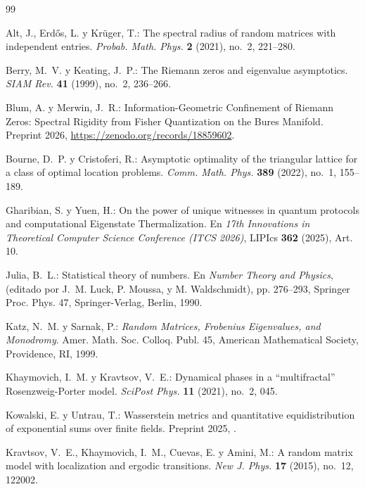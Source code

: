 \documentclass{article}
\numberwithin{equation}{section}
\theoremstyle{plain}
\theoremstyle{definition}
\begin{document}
\begin{thebibliography}{99}

Alt, J., Erdős, L. y Krüger, T.:
The spectral radius of random matrices with independent entries.
\emph{Probab. Math. Phys.} \textbf{2} (2021), no.~2, 221--280.

Berry, M.~V. y Keating, J.~P.: 
The Riemann zeros and eigenvalue asymptotics. 
\emph{SIAM Rev.} \textbf{41} (1999), no.~2, 236--266.

Blum, A. y Merwin, J.~R.:
Information-Geometric Confinement of Riemann Zeros: Spectral Rigidity from Fisher Quantization on the Bures Manifold.
Preprint 2026, \url{https://zenodo.org/records/18859602}.

Bourne, D.~P. y Cristoferi, R.: 
Asymptotic optimality of the triangular lattice for a class of optimal location problems. 
\emph{Comm. Math. Phys.} \textbf{389} (2022), no.~1, 155--189.

Gharibian, S. y Yuen, H.:
On the power of unique witnesses in quantum protocols and computational Eigenstate Thermalization.
En \emph{17th Innovations in Theoretical Computer Science Conference (ITCS 2026)}, LIPIcs \textbf{362} (2025), Art. 10.

Julia, B.~L.: 
Statistical theory of numbers.
En \emph{Number Theory and Physics}, (editado por J.~M. Luck, P. Moussa, y M. Waldschmidt), 
pp. 276--293, Springer Proc. Phys. 47, Springer-Verlag, Berlin, 1990.

Katz, N.~M. y Sarnak, P.: 
\emph{Random Matrices, Frobenius Eigenvalues, and Monodromy}. 
Amer. Math. Soc. Colloq. Publ. 45, American Mathematical Society, Providence, RI, 1999.

Khaymovich, I.~M. y Kravtsov, V.~E.: 
Dynamical phases in a ``multifractal'' Rosenzweig-Porter model.
\emph{SciPost Phys.} \textbf{11} (2021), no.~2, 045.

Kowalski, E. y Untrau, T.:
Wasserstein metrics and quantitative equidistribution of exponential sums over finite fields.
Preprint 2025, .

Kravtsov, V.~E., Khaymovich, I.~M., Cuevas, E. y Amini, M.: 
A random matrix model with localization and ergodic transitions.
\emph{New J. Phys.} \textbf{17} (2015), no.~12, 122002.


\end{thebibliography}
\end{document}
